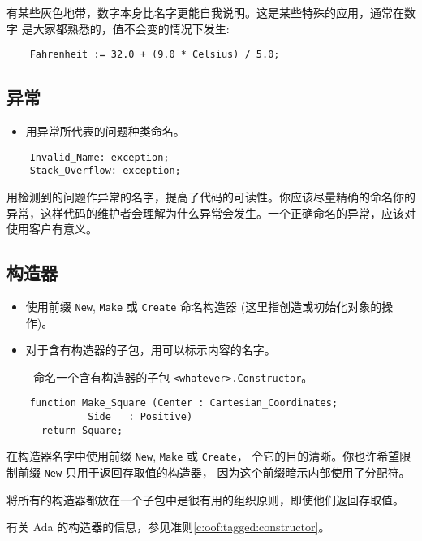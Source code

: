 \begin{blockindent}
有某些灰色地带，数字本身比名字更能自我说明。这是某些特殊的应用，通常在数字
是大家都熟悉的，值不会变的情况下发生:
\begin{lstlisting}
    Fahrenheit := 32.0 + (9.0 * Celsius) / 5.0;
\end{lstlisting}
\end{blockindent}

\subsection{异常}
\begin{itemize}
    \item 用异常所代表的问题种类命名。
\end{itemize}

\begin{lstlisting}
    Invalid_Name: exception;
    Stack_Overflow: exception;
\end{lstlisting}

\begin{blockindent}
用检测到的问题作异常的名字，提高了代码的可读性。你应该尽量精确的命名你的
异常，这样代码的维护者会理解为什么异常会发生。一个正确命名的异常，应该对
使用客户有意义。
\end{blockindent}

\subsection{构造器}
\begin{itemize}
    \item 使用前缀 \texttt{New}, \texttt{Make} 或 \texttt{Create}
命名构造器 (这里指创造或初始化对象的操作)。
    \item 对于含有构造器的子包，用可以标示内容的名字。
\end{itemize}

\begin{itemize}
    \item[-] 命名一个含有构造器的子包 \texttt{<whatever>.Constructor}。
\end{itemize}

\begin{lstlisting}
    function Make_Square (Center : Cartesian_Coordinates;
			  Side   : Positive)
      return Square;
\end{lstlisting}

\begin{blockindent}
在构造器名字中使用前缀 \texttt{New}, \texttt{Make} 或 \texttt{Create}，
令它的目的清晰。你也许希望限制前缀 \texttt{New} 只用于返回存取值的构造器，
因为这个前缀暗示内部使用了分配符。

将所有的构造器都放在一个子包中是很有用的组织原则，即使他们返回存取值。

有关 Ada 的构造器的信息，参见准则\ref{c:oof:tagged:constructor}。
\end{blockindent}

